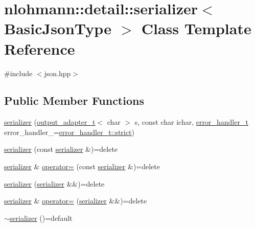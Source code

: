 \hypertarget{classnlohmann_1_1detail_1_1serializer}{}\section{nlohmann\+::detail\+::serializer$<$ Basic\+Json\+Type $>$ Class Template Reference}
\label{classnlohmann_1_1detail_1_1serializer}


{\ttfamily \#include $<$json.\+hpp$>$}

\subsection*{Public Member Functions}
\begin{DoxyCompactItemize}
\item 
\mbox{\hyperlink{classnlohmann_1_1detail_1_1serializer_ac010525281d97867ee842da37294fe83}{serializer}} (\mbox{\hyperlink{namespacenlohmann_1_1detail_a9b680ddfb58f27eb53a67229447fc556}{output\+\_\+adapter\+\_\+t}}$<$ char $>$ s, const char ichar, \mbox{\hyperlink{namespacenlohmann_1_1detail_a5a76b60b26dc8c47256a996d18d967df}{error\+\_\+handler\+\_\+t}} error\+\_\+handler\+\_\+=\mbox{\hyperlink{namespacenlohmann_1_1detail_a5a76b60b26dc8c47256a996d18d967dfa2133fd717402a7966ee88d06f9e0b792}{error\+\_\+handler\+\_\+t\+::strict}})
\item 
\mbox{\hyperlink{classnlohmann_1_1detail_1_1serializer_ae3771351ec4cb892bec707edeb56dc31}{serializer}} (const \mbox{\hyperlink{classnlohmann_1_1detail_1_1serializer}{serializer}} \&)=delete
\item 
\mbox{\hyperlink{classnlohmann_1_1detail_1_1serializer}{serializer}} \& \mbox{\hyperlink{classnlohmann_1_1detail_1_1serializer_a5f14c33012477b9f9876dc54d97009a0}{operator=}} (const \mbox{\hyperlink{classnlohmann_1_1detail_1_1serializer}{serializer}} \&)=delete
\item 
\mbox{\hyperlink{classnlohmann_1_1detail_1_1serializer_a28081304e70cca6b3042c101ee5c498c}{serializer}} (\mbox{\hyperlink{classnlohmann_1_1detail_1_1serializer}{serializer}} \&\&)=delete
\item 
\mbox{\hyperlink{classnlohmann_1_1detail_1_1serializer}{serializer}} \& \mbox{\hyperlink{classnlohmann_1_1detail_1_1serializer_acaafe3436ee5fb74777eb4132a88c513}{operator=}} (\mbox{\hyperlink{classnlohmann_1_1detail_1_1serializer}{serializer}} \&\&)=delete
\item 
\mbox{\hyperlink{classnlohmann_1_1detail_1_1serializer_aa6c62b51cbebb185307df851dc0167f0}{$\sim$serializer}} ()=default

\end{DoxyCompactItemize}

